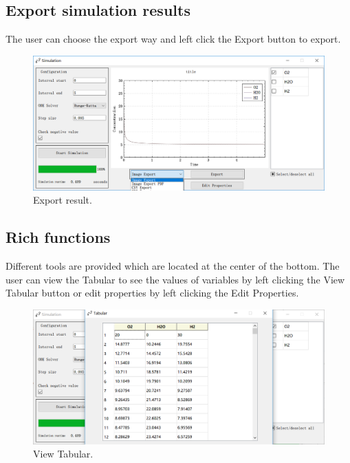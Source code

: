 \documentclass[journal,a4paper,onecolumn]{article}
\begin{document}
\subsection{Export simulation results}
The user can choose the export way and left click the Export button to export.
\begin{figure}[!hbt]
	\begin{center}
		\includegraphics[width=\columnwidth]{fig19}
		\caption{Export result.}
		\label{fig:Export result}
	\end{center}
\end{figure}

\subsection{Rich functions}
Different tools are provided which are located at the center of the bottom. The user can view the Tabular to see the values of variables by left clicking the View Tabular button or edit properties by left clicking the Edit Properties.

\begin{figure}[!hbt]
	\begin{center}
		\includegraphics[width=\columnwidth]{fig16}
		\caption{View Tabular.}
		\label{fig:View Tabular}
	\end{center}
\end{figure}
\end{document}
